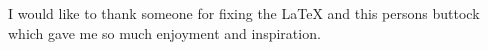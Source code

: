 I would like to thank someone for fixing the LaTeX and this persons buttock which gave me so much enjoyment and inspiration.

